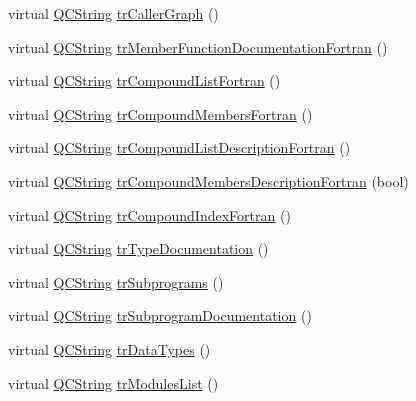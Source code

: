 \begin{DoxyCompactItemize}
\item 
virtual \mbox{\hyperlink{class_q_c_string}{Q\+C\+String}} \mbox{\hyperlink{class_translator_persian_a598d36e9b6fe91aec00a1336a644f7dd}{tr\+Caller\+Graph}} ()
\item 
virtual \mbox{\hyperlink{class_q_c_string}{Q\+C\+String}} \mbox{\hyperlink{class_translator_persian_a2bd374a56b76f0d9559c265cd0f7d9ba}{tr\+Member\+Function\+Documentation\+Fortran}} ()
\item 
virtual \mbox{\hyperlink{class_q_c_string}{Q\+C\+String}} \mbox{\hyperlink{class_translator_persian_a1dac216e341c67144e19d96de69a5321}{tr\+Compound\+List\+Fortran}} ()
\item 
virtual \mbox{\hyperlink{class_q_c_string}{Q\+C\+String}} \mbox{\hyperlink{class_translator_persian_a0e8a22b068be61351086db8eefdde1d0}{tr\+Compound\+Members\+Fortran}} ()
\item 
virtual \mbox{\hyperlink{class_q_c_string}{Q\+C\+String}} \mbox{\hyperlink{class_translator_persian_a338b1e1fff787968f75c402eee15e0d6}{tr\+Compound\+List\+Description\+Fortran}} ()
\item 
virtual \mbox{\hyperlink{class_q_c_string}{Q\+C\+String}} \mbox{\hyperlink{class_translator_persian_a9a535268af1d6ed8279fc6011a03c8bf}{tr\+Compound\+Members\+Description\+Fortran}} (bool)
\item 
virtual \mbox{\hyperlink{class_q_c_string}{Q\+C\+String}} \mbox{\hyperlink{class_translator_persian_a3d25b819fccf3b163af85f46cb024939}{tr\+Compound\+Index\+Fortran}} ()
\item 
virtual \mbox{\hyperlink{class_q_c_string}{Q\+C\+String}} \mbox{\hyperlink{class_translator_persian_a35b3a955ce79b76af01b8f4bdf6a971f}{tr\+Type\+Documentation}} ()
\item 
virtual \mbox{\hyperlink{class_q_c_string}{Q\+C\+String}} \mbox{\hyperlink{class_translator_persian_a3ffef49639f759ede302bc316ca0bafa}{tr\+Subprograms}} ()
\item 
virtual \mbox{\hyperlink{class_q_c_string}{Q\+C\+String}} \mbox{\hyperlink{class_translator_persian_a7c6c3e03c1c7d985a9ee1ba0a5efa719}{tr\+Subprogram\+Documentation}} ()
\item 
virtual \mbox{\hyperlink{class_q_c_string}{Q\+C\+String}} \mbox{\hyperlink{class_translator_persian_aa2e3546529d921587ea817b48e1a9604}{tr\+Data\+Types}} ()
\item 
virtual \mbox{\hyperlink{class_q_c_string}{Q\+C\+String}} \mbox{\hyperlink{class_translator_persian_afd9648acb0b50c362968dae4a5a9a4fa}{tr\+Modules\+List}} ()
\item 

\end{DoxyCompactItemize}
